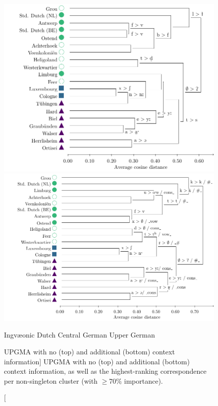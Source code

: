 \documentclass[a4paper]{article}
\def\upper{\color{purple}\FilledBigTriangleUp}
\def\central{\color{midblue}\FilledBigSquare}
\def\dutch{\color{green}\FilledBigCircle}
\def\ingv{\color{green}\BigCircle}
\begin{document}
\begin{figure}[h]
\begin{adjustwidth}{-1cm}{-1cm}
\includegraphics[height=0.45\textheight]{figures/tfidf-nocontext.pdf}\\
\includegraphics[height=0.45\textheight]{figures/tfidf-context.pdf}
\end{adjustwidth}
\vspace{0.3em}
\begin{center}
{\ingv} Ingv\ae{}onic \hspace{1em}
{\dutch} Dutch \hspace{1em}
{\central} Central German \hspace{1em}
{\upper} Upper German
\end{center}
\caption
[UPGMA with no (top) and additional (bottom) context information]
{UPGMA with no (top) and additional (bottom) context information,
as well as the highest-ranking correspondence per non-singleton cluster
(with $\geq$70\% importance).}
\label{fig:tfidf-dendrograms}
\end{figure}
\end{document}

